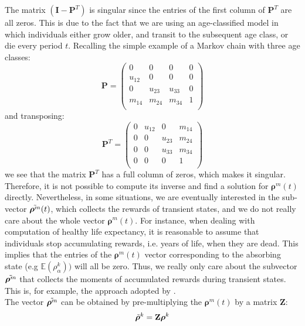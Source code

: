 \documentclass[\main/main.tex]{subfiles}
\begin{document}
The matrix $( \mathbf{I} - \mathbf{P}^T)$ is singular since the entries of the first column of $\mathbf{P}^T$ are all zeros. This is due to the fact that we are using an age-classified model in which individuals either grow older, and transit to the subsequent age class, or die every period $t$. Recalling the simple example of a Markov chain with three age classes:
\begin{equation}
    \mathbf{P}= \begin{pmatrix}
    0 & 0 & 0 & 0\\
    u_{12} & 0 & 0& 0\\
0 & u_{23} & u_{33}& 0\\
m_{14} & m_{24} & m_{34}& 1\\
    \end{pmatrix}
\end{equation}
and transposing:
\begin{equation}
    \mathbf{P}^T= \begin{pmatrix}
    0 &  u_{12} & 0 & m_{14}\\
    0 & 0 & u_{23} & m_{24}\\
    0 & 0 & u_{33} & m_{34}\\
    0 & 0 & 0 &1\\
    \end{pmatrix}
\end{equation}
we see that the matrix $\mathbf{P}^T$ has a full column of zeros, which makes it singular.
Therefore, it is not possible to compute its inverse and find a solution for $ \bm{\rho}^m(t) $ directly. Nevertheless, in some situations, we are eventually interested in the sub-vector $\Tilde{\bm{\rho}^m}(t)$, which collects the rewards of transient states, and we do not really care about the whole vector $ \bm{\rho}^m(t) $. 
For instance, when dealing with computation of healthy life expectancy, it is reasonable to assume that individuals stop accumulating rewards, i.e. years of life, when they are dead. This implies that the entries of the $ \bm{\rho}^m(t) $  vector  corresponding to the absorbing state (e.g $\mathds{E}(\rho_\alpha^k)) $ will all be zero. Thus, we really only care about the subvector  $\Tilde{\bm{\rho}^m}$ that collects the moments of accumulated rewards during transient states. This is, for example, the approach adopted by \cite{Caswell2018}. \\
The vector $\Tilde{\bm{\rho}^m}$ can be obtained by pre-multiplying the  $ \bm{\rho}^m(t) $ by a matrix $\mathbf{Z}$:
\begin{equation}
    \Tilde{\bm{\rho}}^k = \mathbf{Z}\bm{\rho}^k
\end{equation}
\end{document}

